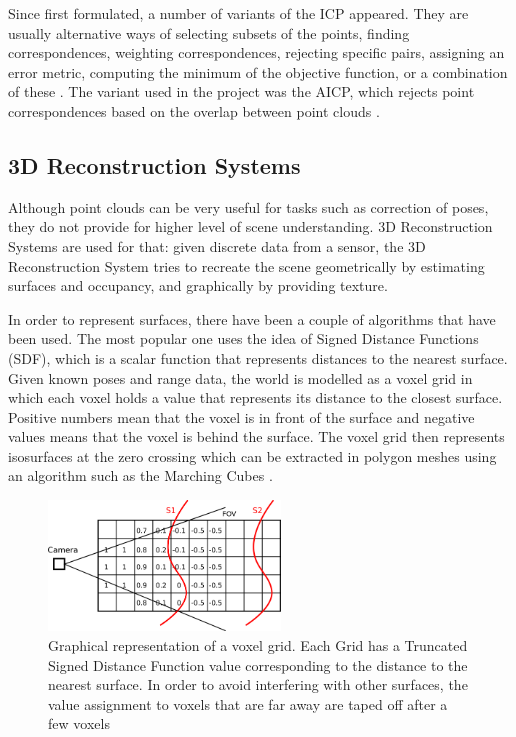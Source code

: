 \documentclass[11pt]{article}
\begin{document}
Since first formulated, a number of variants of the ICP appeared. They are usually alternative ways of selecting subsets of the points, finding correspondences, weighting correspondences, rejecting specific pairs, assigning an error metric, computing the minimum of the objective function, or a combination of these \cite{ICPVariants}. The variant used in the project was the AICP, which rejects point correspondences based on the overlap between point clouds \cite{7989547}.
	
	\subsection{3D Reconstruction Systems}

Although point clouds can be very useful for tasks such as correction of poses, they do not provide for higher level of scene understanding. 3D Reconstruction Systems are used for that: given discrete data from a sensor, the 3D Reconstruction System tries to recreate the scene geometrically by estimating surfaces and occupancy, and graphically by providing texture.
		
In order to represent surfaces, there have been a couple of algorithms that have been used. The most popular one uses the idea of Signed Distance Functions (SDF), which is a scalar function that represents distances to the nearest surface. Given known poses and range data, the world is modelled as a voxel grid in which each voxel holds  a value that represents its distance to the closest surface. Positive numbers mean that the voxel is in front of the surface and negative values means that the voxel is behind the surface. The voxel grid then represents isosurfaces at the zero crossing which can be extracted in polygon meshes using an algorithm such as the Marching Cubes \cite{marchingcubes}.
	
\begin{figure}
	\centering
	\vspace{-58pt}
	\includegraphics[width=0.55\textwidth]{TSDF}
	\caption[t]{Graphical representation of a voxel grid. Each Grid has a Truncated Signed Distance Function value corresponding to the distance to the nearest surface. In order to avoid interfering with other surfaces, the value assignment to voxels that are far away are taped off after a few voxels}
	\label{fig:TSDF}
	\vspace{-20pt}
\end{figure}
\end{document}
